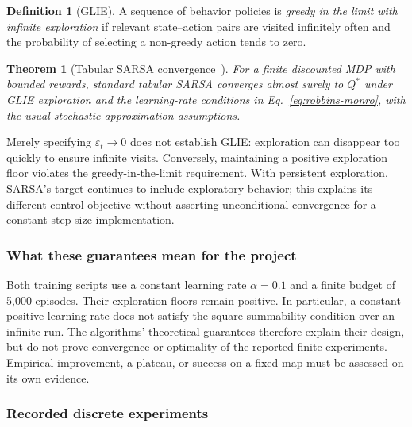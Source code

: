\documentclass[11pt,a4paper]{article}
\theoremstyle{definition}
\newtheorem{definition}{Definition}[section]
\theoremstyle{plain}
\newtheorem{theorem}{Theorem}[section]
\theoremstyle{remark}
\begin{document}
\begin{definition}[GLIE]
A sequence of behavior policies is \emph{greedy in the limit with infinite exploration} if relevant state--action pairs are visited infinitely often and the probability of selecting a non-greedy action tends to zero.
\end{definition}

\begin{theorem}[Tabular SARSA convergence~\cite{singh2000}]
For a finite discounted MDP with bounded rewards, standard tabular SARSA converges almost surely to $Q^*$ under GLIE exploration and the learning-rate conditions in Eq.~\eqref{eq:robbins-monro}, with the usual stochastic-approximation assumptions.
\end{theorem}

Merely specifying $\varepsilon_t\to0$ does not establish GLIE: exploration can disappear too quickly to ensure infinite visits. Conversely, maintaining a positive exploration floor violates the greedy-in-the-limit requirement. With persistent exploration, SARSA's target continues to include exploratory behavior; this explains its different control objective without asserting unconditional convergence for a constant-step-size implementation.

\subsubsection{What these guarantees mean for the project}

Both training scripts use a constant learning rate $\alpha=0.1$ and a finite budget of 5,000 episodes. Their exploration floors remain positive. In particular, a constant positive learning rate does not satisfy the square-summability condition over an infinite run. The algorithms' theoretical guarantees therefore explain their design, but do not prove convergence or optimality of the reported finite experiments. Empirical improvement, a plateau, or success on a fixed map must be assessed on its own evidence.

\subsubsection{Recorded discrete experiments}
\label{sec:discrete-protocol}
\end{document}
